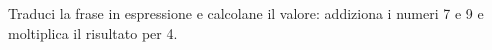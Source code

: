 \item Traduci la frase in espressione e calcolane il valore: addiziona i numeri 7 e 9 e moltiplica il risultato per 4.